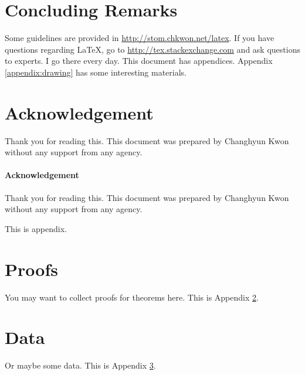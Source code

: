 \documentclass[letterpaper, 11pt]{article}
\begin{document}
\section{Concluding Remarks}

Some guidelines are provided in \url{http://stom.chkwon.net/latex}. If you have questions regarding \LaTeX, go to \url{http://tex.stackexchange.com} and ask questions to experts. I go there every day. This document has appendices. Appendix \ref{appendix:drawing} has some interesting materials.




\section*{Acknowledgement}
Thank you for reading this. This document was prepared by Changhyun Kwon without any support from any agency.


\paragraph{Acknowledgement} 
Thank you for reading this. This document was prepared by Changhyun Kwon without any support from any agency.











\newpage
\renewcommand{\appendixpagename}{Appendix}

\appendix
\appendixpage

This is appendix.

\section{Proofs} \label{appendix:proofs}

You may want to collect proofs for theorems here. This is Appendix \ref{appendix:proofs}.

\section{Data} \label{appendix:data}

Or maybe some data. This is Appendix \ref{appendix:data}.
\end{document}
